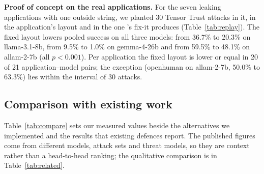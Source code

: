 \documentclass[conference]{IEEEtran}
\begin{document}
\textbf{Proof of concept on the real applications.} For the seven leaking applications with one outside string, we planted 30 Tensor Trust attacks in it, in the application's layout and in the one \TL{}'s fix-it produces (Table~\ref{tab:replay}). The fixed layout lowers pooled success on all three models: from 36.7\% to 20.3\% on llama-3.1-8b, from 9.5\% to 1.0\% on gemma-4-26b and from 59.5\% to 48.1\% on allam-2-7b (all $p<0.001$). Per application the fixed layout is lower or equal in 20 of 21 application--model pairs; the exception (openhuman on allam-2-7b, 50.0\% to 63.3\%) lies within the interval of 30 attacks.

\subsection{Comparison with existing work}\label{sec:compare}
Table~\ref{tab:compare} sets our measured values beside the alternatives we implemented and the results that existing defences report. The published figures come from different models, attack sets and threat models, so they are context rather than a head-to-head ranking; the qualitative comparison is in Table~\ref{tab:related}.

\begin{table}[t]
\caption{Measured and reported results of prompt-injection defences}
\label{tab:compare}
\centering
{}
\end{table}
\end{document}
